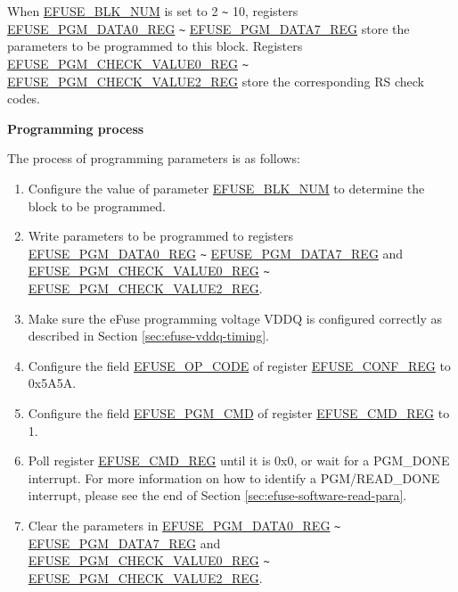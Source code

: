 \documentclass[main\_\_EN.tex]{subfiles}
\begin{document}
When \hyperref[fielddesc:EFUSEBLKNUM]{EFUSE\_BLK\_NUM} is set to 2 \verb+~+ 10, registers \\ \hyperref[regdesc:EFUSEPGMDATA0REG]{EFUSE\_PGM\_DATA0\_REG} \verb+~+ \hyperref[regdesc:EFUSEPGMDATA7REG]{EFUSE\_PGM\_DATA7\_REG} store the parameters to be programmed to this block. Registers \hyperref[regdesc:EFUSEPGMCHECKVALUE0REG]{EFUSE\_PGM\_CHECK\_VALUE0\_REG} \verb+~+ \hyperref[regdesc:EFUSEPGMCHECKVALUE2REG]{EFUSE\_PGM\_CHECK\_VALUE2\_REG} store the corresponding RS check codes.

{\bfseries Programming process}

The process of programming parameters is as follows:

\begin{enumerate}
\item Configure the value of parameter \hyperref[fielddesc:EFUSEBLKNUM]{EFUSE\_BLK\_NUM} to determine the block to be programmed.

\item Write parameters to be programmed to registers \hyperref[regdesc:EFUSEPGMDATA0REG]{EFUSE\_PGM\_DATA0\_REG} \verb+~+ \hyperref[regdesc:EFUSEPGMDATA7REG]{EFUSE\_PGM\_DATA7\_REG} and  \hyperref[regdesc:EFUSEPGMCHECKVALUE0REG]{EFUSE\_PGM\_CHECK\_VALUE0\_REG} \verb+~+ \hyperref[regdesc:EFUSEPGMCHECKVALUE2REG]{EFUSE\_PGM\_CHECK\_VALUE2\_REG}.

\item Make sure the eFuse programming voltage VDDQ is configured correctly as described in Section \ref{sec:efuse-vddq-timing}.

\item Configure the field \hyperref[fielddesc:EFUSEOPCODE]{EFUSE\_OP\_CODE} of register \hyperref[regdesc:EFUSECONFREG]{EFUSE\_CONF\_REG} to 0x5A5A.

\item Configure the field \hyperref[fielddesc:EFUSEPGMCMD]{EFUSE\_PGM\_CMD} of register \hyperref[regdesc:EFUSECMDREG]{EFUSE\_CMD\_REG} to 1.

\item Poll register \hyperref[regdesc:EFUSECMDREG]{EFUSE\_CMD\_REG} until it is 0x0, or wait for a PGM\_DONE interrupt. For more information on how to identify a PGM/READ\_DONE interrupt, please see the end of Section \ref{sec:efuse-software-read-para}.

\item Clear the parameters in \hyperref[regdesc:EFUSEPGMDATA0REG]{EFUSE\_PGM\_DATA0\_REG} \verb+~+ \hyperref[regdesc:EFUSEPGMDATA7REG]{EFUSE\_PGM\_DATA7\_REG} and \\ \hyperref[regdesc:EFUSEPGMCHECKVALUE0REG]{EFUSE\_PGM\_CHECK\_VALUE0\_REG} \verb+~+ \hyperref[regdesc:EFUSEPGMCHECKVALUE2REG]{EFUSE\_PGM\_CHECK\_VALUE2\_REG}.


\end{enumerate}
\end{document}
